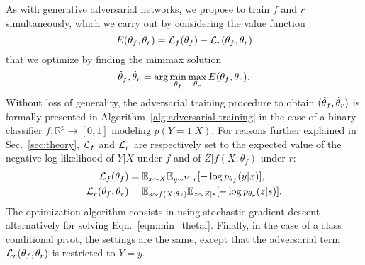 \documentclass{article}
\theoremstyle{plain}
\begin{document}

As with generative adversarial networks, we propose to
train $f$ and $r$ simultaneously, which we carry out by considering
the value function
\begin{equation}
    E(\theta_f, \theta_r) = {\cal L}_f(\theta_f) - {\cal L}_r(\theta_f, \theta_r)
\end{equation}
that we optimize by finding the minimax solution
\begin{equation}\label{eqn:min_thetaf}
    \smash{\hat\theta_f, \hat\theta_r} = \arg \min_{\theta_f} \max_{\theta_r} E(\theta_f, \theta_r).
\end{equation}
Without loss of generality, the adversarial training procedure to obtain
$(\smash{\hat\theta_f}, \smash{\hat\theta_r})$ is formally presented in
Algorithm~\ref{alg:adversarial-training} in the case of a binary classifier $f :
\mathbb{R}^p \to [0,1]$ modeling $p(Y=1|X)$. For reasons further explained
in Sec.~\ref{sec:theory}, ${\cal L}_f$ and ${\cal L}_r$  are respectively set to the
expected value of the
negative log-likelihood of $Y|X$ under $f$ and of $Z|f(X;\theta_f)$ under
$r$:
\begin{align}
    {\cal L}_f(\theta_f) &= \mathbb{E}_{x \sim X}  \mathbb{E}_{y \sim Y|x} [ -\log p_{\theta_f} (y|x) ], \\
    {\cal L}_r(\theta_f, \theta_r) &= \mathbb{E}_{s \sim f(X;\theta_f)}  \mathbb{E}_{z \sim Z|s} [-\log p_{\theta_r} (z|s)].
\end{align}
The optimization algorithm consists in using stochastic gradient descent
alternatively for solving Eqn.~\ref{eqn:min_thetaf}.
Finally, in the case of a class conditional pivot, the settings are the
same, except that the adversarial term ${\cal L}_r(\theta_f, \theta_r)$ is restricted to $Y=y$.
\end{document}
